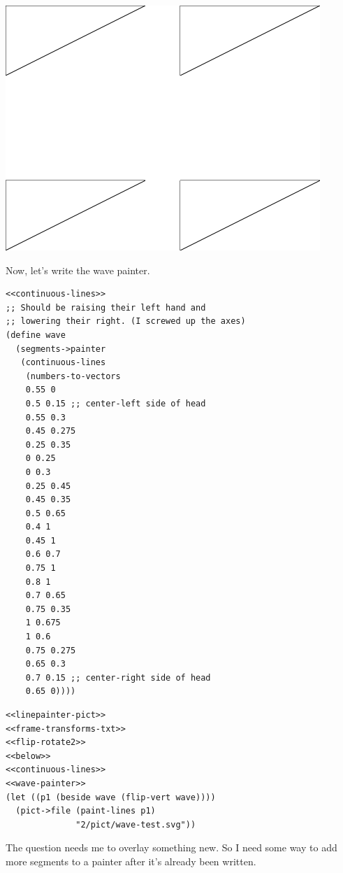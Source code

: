 \documentclass[final,fleqn,titlepage,twoside]{article}
\begin{document}
\begin{center}
\includegraphics[width=.9\linewidth]{2/pict/cl-test.png}
\end{center}

Now, let's write the wave painter.

\begin{verbatim}
<<continuous-lines>>
;; Should be raising their left hand and
;; lowering their right. (I screwed up the axes)
(define wave
  (segments->painter
   (continuous-lines
    (numbers-to-vectors
    0.55 0
    0.5 0.15 ;; center-left side of head
    0.55 0.3
    0.45 0.275
    0.25 0.35
    0 0.25
    0 0.3
    0.25 0.45
    0.45 0.35
    0.5 0.65
    0.4 1
    0.45 1
    0.6 0.7
    0.75 1
    0.8 1
    0.7 0.65
    0.75 0.35
    1 0.675
    1 0.6
    0.75 0.275
    0.65 0.3
    0.7 0.15 ;; center-right side of head
    0.65 0))))
\end{verbatim}

\begin{verbatim}
<<linepainter-pict>>
<<frame-transforms-txt>>
<<flip-rotate2>>
<<below>>
<<continuous-lines>>
<<wave-painter>>
(let ((p1 (beside wave (flip-vert wave))))
  (pict->file (paint-lines p1)
              "2/pict/wave-test.svg"))
\end{verbatim}

The question needs me to overlay something new. So I need some way to add more
segments to a painter after it's already been written.
\end{document}
